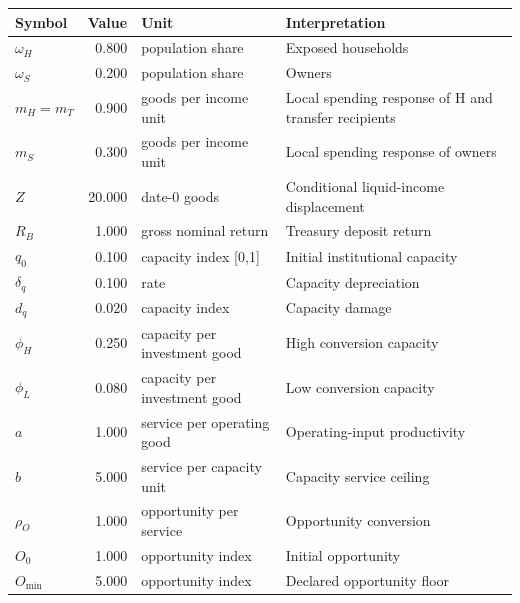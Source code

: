 \begin{tabularx}{\textwidth}{l r l X}
\toprule
Symbol & Value & Unit & Interpretation \\
\midrule
$\omega_H$ & 0.800 & population share & Exposed households \\
$\omega_S$ & 0.200 & population share & Owners \\
$m_H=m_T$ & 0.900 & goods per income unit & Local spending response of H and transfer recipients \\
$m_S$ & 0.300 & goods per income unit & Local spending response of owners \\
$Z$ & 20.000 & date-0 goods & Conditional liquid-income displacement \\
$R_B$ & 1.000 & gross nominal return & Treasury deposit return \\
$q_0$ & 0.100 & capacity index [0,1] & Initial institutional capacity \\
$\delta_q$ & 0.100 & rate & Capacity depreciation \\
$d_q$ & 0.020 & capacity index & Capacity damage \\
$\phi_H$ & 0.250 & capacity per investment good & High conversion capacity \\
$\phi_L$ & 0.080 & capacity per investment good & Low conversion capacity \\
$a$ & 1.000 & service per operating good & Operating-input productivity \\
$b$ & 5.000 & service per capacity unit & Capacity service ceiling \\
$\rho_O$ & 1.000 & opportunity per service & Opportunity conversion \\
$O_0$ & 1.000 & opportunity index & Initial opportunity \\
$O_{\min}$ & 5.000 & opportunity index & Declared opportunity floor \\
\bottomrule
\end{tabularx}
